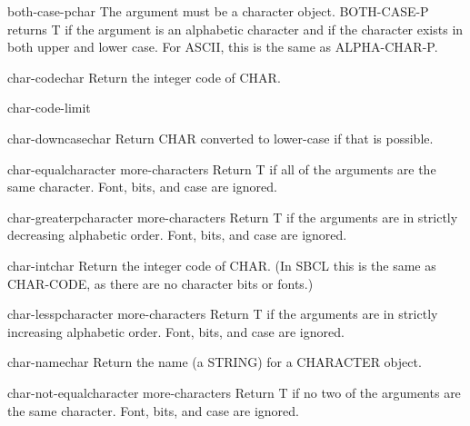 \begin{function}{both-case-p}{char}{}
  The argument must be a character object. BOTH-CASE-P returns T if the
  argument is an alphabetic character and if the character exists in
  both upper and lower case. For ASCII, this is the same as ALPHA-CHAR-P.
\end{function}

\begin{function}{char-code}{char}{}
  Return the integer code of CHAR.
\end{function}

\begin{constant}{char-code-limit}{}{}
  
\end{constant}

\begin{function}{char-downcase}{char}{}
  Return CHAR converted to lower-case if that is possible.
\end{function}

\begin{function}{char-equal}{character \rest more-characters}{}
  Return T if all of the arguments are the same character.
  Font, bits, and case are ignored.
\end{function}

\begin{function}{char-greaterp}{character \rest more-characters}{}
  Return T if the arguments are in strictly decreasing alphabetic order.
   Font, bits, and case are ignored.
\end{function}

\begin{function}{char-int}{char}{}
  Return the integer code of CHAR. (In SBCL this is the same as CHAR-CODE, as
   there are no character bits or fonts.)
\end{function}

\begin{function}{char-lessp}{character \rest more-characters}{}
  Return T if the arguments are in strictly increasing alphabetic order.
   Font, bits, and case are ignored.
\end{function}

\begin{function}{char-name}{char}{}
  Return the name (a STRING) for a CHARACTER object.
\end{function}

\begin{function}{char-not-equal}{character \rest more-characters}{}
  Return T if no two of the arguments are the same character.
   Font, bits, and case are ignored.
\end{function}

